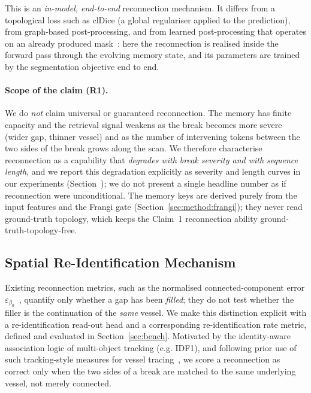 This is an \emph{in-model, end-to-end} reconnection mechanism. It differs from a
topological loss such as clDice (a global regulariser applied to the prediction),
from graph-based post-processing, and from learned post-processing that operates on
an already produced mask~\cite{creatis}: here the reconnection is realised inside the
forward pass through the evolving memory state, and its parameters are trained by the
segmentation objective end to end.

\paragraph{Scope of the claim (R1).}
We do \emph{not} claim universal or guaranteed reconnection. The memory has finite
capacity and the retrieval signal weakens as the break becomes more severe (wider
gap, thinner vessel) and as the number of intervening tokens between the two sides of
the break grows along the scan. We therefore characterise reconnection as a
capability that \emph{degrades with break severity and with sequence length}, and we
report this degradation explicitly as severity and length curves in our experiments
(Section~); we do not present a single headline number as if
reconnection were unconditional. The memory keys are derived purely from the input
features and the Frangi gate (Section~\ref{sec:method:frangi}); they never read
ground-truth topology, which keeps the Claim~1 reconnection ability
ground-truth-topology-free.

\subsection{Spatial Re-Identification Mechanism}
\label{sec:method:reid}

Existing reconnection metrics, such as the normalised connected-component error
$\varepsilon_{\beta_0}$~\cite{creatis}, quantify only whether a gap has been
\emph{filled}; they do not test whether the filler is the continuation of the
\emph{same} vessel. We make this distinction explicit with a re-identification
read-out head and a corresponding re-identification rate metric, defined and
evaluated in Section~\ref{sec:bench}. Motivated by the identity-aware association
logic of multi-object tracking (e.g. IDF1), and following prior use of such
tracking-style measures for vessel tracing~\cite{snaketracker}, we score a
reconnection as correct only when the two sides of a break are matched to the same
underlying vessel, not merely connected.

